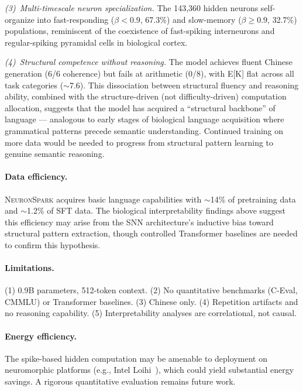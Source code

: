 \documentclass{article}
\newcommand{\model}{\textsc{NeuronSpark}}
\begin{document}
\emph{(3)~Multi-timescale neuron specialization.}
The 143,360 hidden neurons self-organize into fast-responding ($\beta < 0.9$, 67.3\%) and slow-memory ($\beta \geq 0.9$, 32.7\%) populations, reminiscent of the coexistence of fast-spiking interneurons and regular-spiking pyramidal cells in biological cortex.

\emph{(4)~Structural competence without reasoning.}
The model achieves fluent Chinese generation (6/6 coherence) but fails at arithmetic (0/8), with E[K] flat across all task categories ($\sim$7.6).
This dissociation between structural fluency and reasoning ability, combined with the structure-driven (not difficulty-driven) computation allocation, suggests that the model has acquired a ``structural backbone'' of language --- analogous to early stages of biological language acquisition where grammatical patterns precede semantic understanding.
Continued training on more data would be needed to progress from structural pattern learning to genuine semantic reasoning.

\paragraph{Data efficiency.}
\model{} acquires basic language capabilities with $\sim$14\% of pretraining data and $\sim$1.2\% of SFT data.
The biological interpretability findings above suggest this efficiency may arise from the SNN architecture's inductive bias toward structural pattern extraction, though controlled Transformer baselines are needed to confirm this hypothesis.

\paragraph{Limitations.}
(1) 0.9B parameters, 512-token context. (2) No quantitative benchmarks (C-Eval, CMMLU) or Transformer baselines. (3) Chinese only. (4) Repetition artifacts and no reasoning capability. (5) Interpretability analyses are correlational, not causal.

\paragraph{Energy efficiency.}
The spike-based hidden computation may be amenable to deployment on neuromorphic platforms (e.g., Intel Loihi~\citep{davies2018loihi}), which could yield substantial energy savings. A rigorous quantitative evaluation remains future work.

\end{document}

